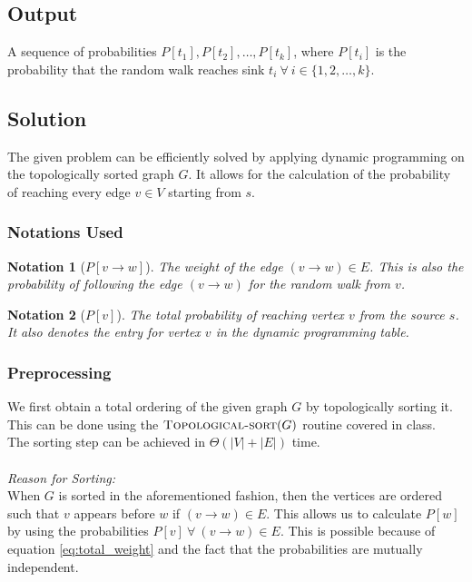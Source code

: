 \documentclass[12pt]{report}
\newtheorem{notation}{Notation}
\begin{document}
    \subsection*{Output}
    A sequence of probabilities $P[t_{1}], P[t_{2}], \dots, P[t_{k}]$, where $P[t_{i}]$ is the probability that the random walk
    reaches sink $t_{i} \ \forall \ i \in \{ 1, 2, \dots, k \}$.

    \subsection*{Solution}
    The given problem can be efficiently solved by applying dynamic programming on the topologically sorted graph $G$.
    It allows for the calculation of the probability of reaching every edge $v \in V$ starting from $s$.

    \subsubsection*{Notations Used}
    \begin{notation}[$P{[v \to w]}$]
        The weight of the edge $(v \to w) \in E$. This is also the probability of following the edge $(v \to w)$ for the random walk from $v$.
    \end{notation}

    \begin{notation}[$P{[v]}$]
        The total probability of reaching vertex $v$ from the source $s$.
        It also denotes the entry for vertex $v$ in the dynamic programming table.
    \end{notation}

    \subsubsection*{Preprocessing}
    We first obtain a total ordering of the given graph $G$ by topologically sorting it.
    This can be done using the $\Call{Topological-sort}{G}$ routine covered in class. \\
    The sorting step can be achieved in $\Theta(|V|+|E|)$ time. \\
    \vspace*{2.5pt} \\
    \textit{Reason for Sorting:}
    \vspace*{2.5pt} \\
    When $G$ is sorted in the aforementioned fashion, then the vertices are ordered such that $v$ appears before $w$ if $(v \to w) \in E$.
    This allows us to calculate $P[w]$ by using the probabilities $P[v] \ \forall \ (v \to w) \in E$.
    This is possible because of equation \eqref{eq:total_weight} and the fact that the probabilities are mutually independent.
\end{document}
